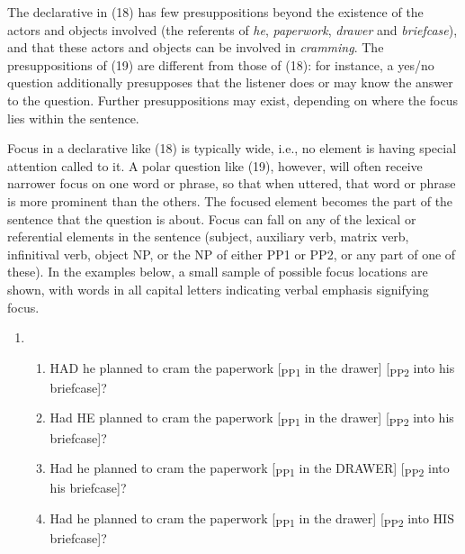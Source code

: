 \documentclass[11pt,oneside]{book}
\providecommand{\tightlist}{%
  \setlength{\itemsep}{0pt}\setlength{\parskip}{0pt}}
\begin{document}
The declarative in (18) has few presuppositions beyond the existence of the actors and objects involved (the referents of \emph{he}, \emph{paperwork}, \emph{drawer} and \emph{briefcase}), and that these actors and objects can be involved in \emph{cramming}. The presuppositions of (19) are different from those of (18): for instance, a yes/no question additionally presupposes that the listener does or may know the answer to the question. Further presuppositions may exist, depending on where the focus lies within the sentence.

Focus in a declarative like (18) is typically wide, i.e., no element is having special attention called to it. A polar question like (19), however, will often receive narrower focus on one word or phrase, so that when uttered, that word or phrase is more prominent than the others. The focused element becomes the part of the sentence that the question is about. Focus can fall on any of the lexical or referential elements in the sentence (subject, auxiliary verb, matrix verb, infinitival verb, object NP, or the NP of either PP1 or PP2, or any part of one of these). In the examples below, a small sample of possible focus locations are shown, with words in all capital letters indicating verbal emphasis signifying focus.

\singlespacing

\begin{enumerate}
\def\labelenumi{(\arabic{enumi})}
\setcounter{enumi}{19}
\item
  \begin{enumerate}
  \def\labelenumii{\alph{enumii}.}
  \tightlist
  \item
    HAD he planned to cram the paperwork {[}\textsubscript{PP1} in the drawer{]} {[}\textsubscript{PP2} into his briefcase{]}?
  \item
    Had HE planned to cram the paperwork {[}\textsubscript{PP1} in the drawer{]} {[}\textsubscript{PP2} into his briefcase{]}?
  \item
    Had he planned to cram the paperwork {[}\textsubscript{PP1} in the DRAWER{]} {[}\textsubscript{PP2} into his briefcase{]}?
  \item
    Had he planned to cram the paperwork {[}\textsubscript{PP1} in the drawer{]} {[}\textsubscript{PP2} into HIS briefcase{]}?
  \end{enumerate}
\end{enumerate}

\doublespacing
\end{document}
